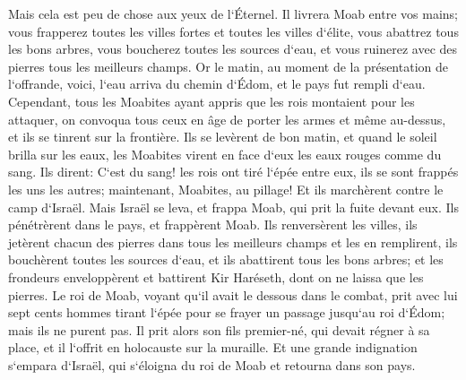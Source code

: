 \verse Mais cela est peu de chose aux yeux de l`Éternel. Il livrera Moab entre vos mains; 
\verse vous frapperez toutes les villes fortes et toutes les villes d`élite, vous abattrez tous les bons arbres, vous boucherez toutes les sources d`eau, et vous ruinerez avec des pierres tous les meilleurs champs. 
\verse Or le matin, au moment de la présentation de l`offrande, voici, l`eau arriva du chemin d`Édom, et le pays fut rempli d`eau. 
\verse Cependant, tous les Moabites ayant appris que les rois montaient pour les attaquer, on convoqua tous ceux en âge de porter les armes et même au-dessus, et ils se tinrent sur la frontière. 
\verse Ils se levèrent de bon matin, et quand le soleil brilla sur les eaux, les Moabites virent en face d`eux les eaux rouges comme du sang. 
\verse Ils dirent: C`est du sang! les rois ont tiré l`épée entre eux, ils se sont frappés les uns les autres; maintenant, Moabites, au pillage! 
\verse Et ils marchèrent contre le camp d`Israël. Mais Israël se leva, et frappa Moab, qui prit la fuite devant eux. Ils pénétrèrent dans le pays, et frappèrent Moab. 
\verse Ils renversèrent les villes, ils jetèrent chacun des pierres dans tous les meilleurs champs et les en remplirent, ils bouchèrent toutes les sources d`eau, et ils abattirent tous les bons arbres; et les frondeurs enveloppèrent et battirent Kir Haréseth, dont on ne laissa que les pierres. 
\verse Le roi de Moab, voyant qu`il avait le dessous dans le combat, prit avec lui sept cents hommes tirant l`épée pour se frayer un passage jusqu`au roi d`Édom; mais ils ne purent pas. 
\verse Il prit alors son fils premier-né, qui devait régner à sa place, et il l`offrit en holocauste sur la muraille. Et une grande indignation s`empara d`Israël, qui s`éloigna du roi de Moab et retourna dans son pays. 

\chapter{}

